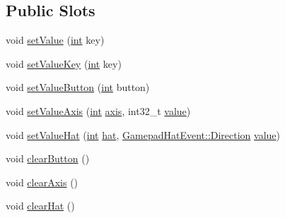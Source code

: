 \subsection*{Public Slots}
\begin{DoxyCompactItemize}
\item 
void \mbox{\hyperlink{class_q_g_b_a_1_1_key_editor_af9e4f2efe7c3edb632a31135b413c73b}{set\+Value}} (\mbox{\hyperlink{ioapi_8h_a787fa3cf048117ba7123753c1e74fcd6}{int}} key)
\item 
void \mbox{\hyperlink{class_q_g_b_a_1_1_key_editor_a80ecd8bd41c6e71f8907391aeb1b2976}{set\+Value\+Key}} (\mbox{\hyperlink{ioapi_8h_a787fa3cf048117ba7123753c1e74fcd6}{int}} key)
\item 
void \mbox{\hyperlink{class_q_g_b_a_1_1_key_editor_ac4369964864ef0df3e9455ab444bbc3b}{set\+Value\+Button}} (\mbox{\hyperlink{ioapi_8h_a787fa3cf048117ba7123753c1e74fcd6}{int}} button)
\item 
void \mbox{\hyperlink{class_q_g_b_a_1_1_key_editor_a55a17cb898ce452a4060355fbe431371}{set\+Value\+Axis}} (\mbox{\hyperlink{ioapi_8h_a787fa3cf048117ba7123753c1e74fcd6}{int}} \mbox{\hyperlink{class_q_g_b_a_1_1_key_editor_aed1e594b4662a661a9b5d111c9fa5ab9}{axis}}, int32\+\_\+t \mbox{\hyperlink{class_q_g_b_a_1_1_key_editor_a6065db62f1781bf111e5133e2f0948ce}{value}})
\item 
void \mbox{\hyperlink{class_q_g_b_a_1_1_key_editor_a3836e2a099626c0dfe682d63960c647d}{set\+Value\+Hat}} (\mbox{\hyperlink{ioapi_8h_a787fa3cf048117ba7123753c1e74fcd6}{int}} \mbox{\hyperlink{class_q_g_b_a_1_1_key_editor_a13aee5f3cf3a557a96334eda9b44b6d0}{hat}}, \mbox{\hyperlink{class_q_g_b_a_1_1_gamepad_hat_event_ae3f20662c61b054e5344aafb9d843837}{Gamepad\+Hat\+Event\+::\+Direction}} \mbox{\hyperlink{class_q_g_b_a_1_1_key_editor_a6065db62f1781bf111e5133e2f0948ce}{value}})
\item 
void \mbox{\hyperlink{class_q_g_b_a_1_1_key_editor_acc1599328743f8611ca030571cb0c96a}{clear\+Button}} ()
\item 
void \mbox{\hyperlink{class_q_g_b_a_1_1_key_editor_ad813791e61eec2df461175cdf042418b}{clear\+Axis}} ()
\item 
void \mbox{\hyperlink{class_q_g_b_a_1_1_key_editor_ab9b54608647abd9e963cf725910d6038}{clear\+Hat}} ()
\end{DoxyCompactItemize}
